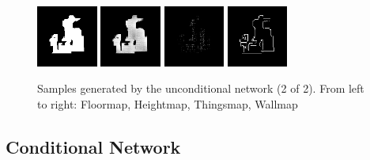 \begin{figure}[h!]
\begin{minipage}[b]{\linewidth}
	\begin{center}
		\includegraphics[width=2cm]{figures/results/samples/uncond/sample8_map_floormap_generated.png}
		\includegraphics[width=2cm]{figures/results/samples/uncond/sample8_map_heightmap_generated.png}
		\includegraphics[width=2cm]{figures/results/samples/uncond/sample8_map_thingsmap_generated.png}
		\includegraphics[width=2cm]{figures/results/samples/uncond/sample8_map_wallmap_generated.png}
	\end{center}

\end{minipage}
\caption[Samples Generated by the Unconditional network (2 of 2)]{Samples generated by the unconditional network (2 of 2). From left to right: Floormap, Heightmap, Thingsmap, Wallmap}
\end{figure}

\FloatBarrier
\subsection{Conditional Network}
